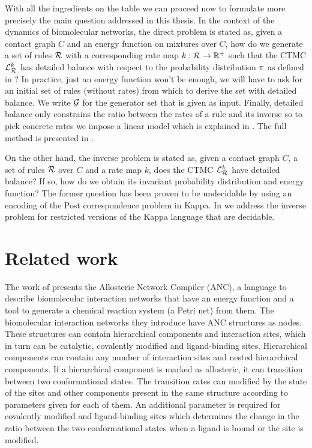 With all the ingredients on the table %
we can proceed now to formulate more precisely
the main question addressed in this thesis.
In the context of the dynamics of biomolecular networks,
the direct problem is stated as,
given a contact graph $C$ and
an energy function on mixtures over $C$,
how do we generate a set of rules $\mathcal{R}$
with a corresponding rate map $k: \mathcal{R} \to \mathbb{R}^+$
such that the CTMC $\mathcal{L}^k_{\mathcal{R}}$ has detailed balance with respect to
the probability distribution $\pi$ as defined in ?
In practice, just an energy function won't be enough,
we will have to ask for an initial set of rules (without rates)
from which to derive the set with detailed balance.
We write $\mathcal{G}$ for the generator set that is given as input.
Finally, detailed balance only constrains the ratio between
the rates of a rule and its inverse so to pick concrete rates
we impose a linear model which is explained in .
The full method is presented in .

On the other hand, the inverse problem is stated as,
given a contact graph $C$,
a set of rules $\mathcal{R}$ over $C$
and a rate map $k$,
does the CTMC $\mathcal{L}^k_{\mathcal{R}}$ have detailed balance?
If so, how do we obtain its invariant probability distribution
and energy function?
The former question has been proven to be undecidable by \citet{et1}
using an encoding of the Post correspondence problem \citep{post}
in Kappa.
In  we address the inverse problem for
restricted versions of the Kappa language
that are decidable.


\section{Related work}

The work of \citet{anc} presents the Allosteric Network Compiler
(ANC), a language to describe biomolecular interaction networks
that have an energy function and a tool to generate
a chemical reaction system (\ie a Petri net) from them.
The biomolecular interaction networks they introduce
have ANC structures as nodes.
These structures can contain hierarchical components and
interaction sites, which in turn can be catalytic,
covalently modified and ligand-binding sites.
Hierarchical components can contain any number of
interaction sites and nested hierarchical components.
If a hierarchical component is marked as allosteric,
it can transition between two conformational states.
The transition rates can modified by the state of the sites and
other components present in the same structure
according to parameters given for each of them.
An additional parameter is required for covalently modified
and ligand-binding sites which determines the change in the ratio
between the two conformational states when a ligand is bound
or the site is modified.

